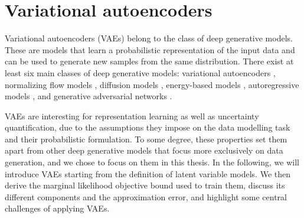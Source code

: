 \section{Variational autoencoders}
%
Variational autoencoders (VAEs) belong to the class of deep generative models. These are models that learn a probabilistic representation of the input data and can be used to generate new samples from the same distribution. 
There exist at least six main classes of deep generative models: variational autoencoders \parencite{kingma_autoencoding_2014,rezende_stochastic_2014,ranganath_hierarchical_2016,vahdat_nvae_2020,child_very_2021}, normalizing flow models \parencite{dinh_nice_2015,rezende_variational_2015,dinh_density_2017,kingma_glow_2018,grathwohl_ffjord_2018}, diffusion models \parencite{sohl-dickstein_deep_2015,song_generative_2019, ho_denoising_2020, vahdat_scorebased_2021}, energy-based models \parencite{lecun_tutorial_2006,hinton_fast_2006,salakhutdinov_efficient_2010,du_implicit_2019}, autoregressive models \parencite{oord_conditional_2016,oord_wavenet_2016,radford_improving_2018}, and generative adversarial networks \parencite{goodfellow_generative_2014,arjovsky_wasserstein_2017,brock_large_2019,karras_stylebased_2019}. 

VAEs are interesting for representation learning as well as uncertainty quantification, due to the assumptions they impose on the data modelling task and their probabilistic formulation. To some degree, these properties set them apart from other deep generative models that focus more exclusively on data generation, and we chose to focus on them in this thesis. 
In the following, we will introduce VAEs starting from the definition of latent variable models. We then derive the marginal likelihood objective bound used to train them, discuss its different components and the approximation error, and highlight some central challenges of applying VAEs.



